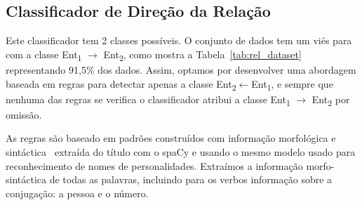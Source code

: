 \documentclass[a4paper, twocolumn, 11pt, twoside]{article}
\begin{document}

%

%




\subsection{Classificador de Direção da Relação}
\label{subsec:rel_direction}

Este classificador tem 2 classes possíveis. O conjunto de dados tem um viés para com a classe Ent\textsubscript{1} $\rightarrow$ Ent\textsubscript{2}, como mostra a Tabela~\ref{tab:rel_dataset} representando 91,5\% dos dados. Assim, optamos por desenvolver uma abordagem baseada em regras para detectar apenas a classe Ent\textsubscript{2}$\leftarrow$Ent\textsubscript{1}, e sempre que nenhuma das regras se verifica o classificador atribui a classe Ent\textsubscript{1} $\rightarrow$ Ent\textsubscript{2} por omissão.

As regras são baseado em padrões construídos com informação morfológica e sintáctica~\citep{nivre-etal-2020-universal} extraída do título com o spaCy e usando o mesmo modelo usado para reconhecimento de nomes de personalidades. Extraímos a informação morfo-sintáctica de todas as palavras, incluindo para os verbos informação sobre a conjugação: a pessoa e o número.
\end{document}
